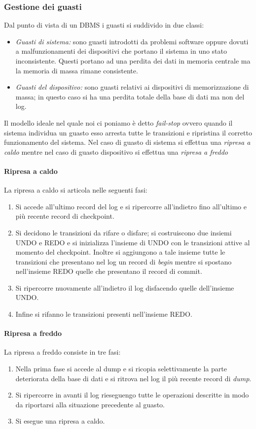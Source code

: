 \subsubsection{Gestione dei guasti}
Dal punto di vista di un DBMS i guasti si suddivido in due classi:
\begin{itemize}
\item \emph{Guasti di sistema:} sono guasti introdotti da problemi software oppure dovuti a malfunzionamenti dei dispositivi che portano il sistema in uno stato inconsistente. Questi portano ad una perdita dei dati in memoria centrale ma la memoria di massa rimane consistente.
\item \emph{Guasti del dispositivo:} sono guasti relativi ai dispositivi di memorizzazione di massa; in questo caso si ha una perdita totale della base di dati ma non del log.
\end{itemize}
Il modello ideale nel quale noi ci poniamo è detto \emph{fail-stop} ovvero quando il sistema individua un guasto esso arresta tutte le transizioni e ripristina il corretto funzionamento del sistema. Nel caso di guasto di sistema si effettua una \emph{ripresa a caldo} mentre nel caso di guasto dispositivo si effettua una \emph{ripresa a freddo}
\paragraph{Ripresa a caldo} La ripresa a caldo si articola nelle seguenti fasi:
\begin{enumerate}
\item Si accede all'ultimo record del log e si ripercorre all'indietro fino all'ultimo e più recente record di checkpoint.
\item Si decidono le transizioni da rifare o disfare; si costruiscono due insiemi UNDO e REDO e si inizializza l'insieme di UNDO con le transizioni attive al momento del checkpoint. Inoltre si aggiungono a tale insieme tutte le transizioni che presentano nel log un record di \emph{begin} mentre si spostano nell'insieme REDO quelle che presentano il record di commit.
\item Si ripercorre nuovamente all'indietro il log disfacendo quelle dell'insieme UNDO.
\item Infine si rifanno le transizioni presenti nell'insieme REDO.
\end{enumerate}
\paragraph{Ripresa a freddo} La ripresa a freddo consiste in tre fasi:
\begin{enumerate}
\item Nella prima fase si accede al dump e si ricopia selettivamente la parte deteriorata della base di dati e si ritrova nel log il più recente record di \emph{dump}.
\item Si ripercorre in avanti il log rieseguengo tutte le operazioni descritte in modo da riportarsi alla situazione precedente al guasto.
\item Si esegue una ripresa a caldo.
\end{enumerate}
